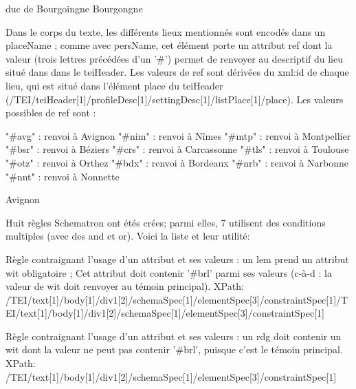 \documentclass[12pt, a4paper]{article}
\begin{document}
                        
                           duc de
                              Bourgoingne
                              Bourgongne
                           
                           
                        
                     Dans le corps du texte, les différents lieux mentionnés sont encodés dans un placeName ; comme avec persName, cet élément porte un attribut ref
                        dont la valeur (trois lettres précédées d'un '#') permet de renvoyer au descriptif du lieu situé dans dans le teiHeader. Les valeurs de ref sont dérivées du
                        xml:id de chaque lieu, qui est situé dans l'élément place du teiHeader (/TEI/teiHeader[1]/profileDesc[1]/settingDesc[1]/listPlace[1]/place).
                        Les valeurs possibles de ref sont :
                        
                           "#avg" : renvoi à Avignon
                           "#nim" : renvoi à Nîmes
                           "#mtp" : renvoi à Montpellier
                           "#bsr" : renvoi à Béziers
                           "#crs" : renvoi à Carcassonne
                           "#tls" : renvoi à Toulouse
                           "#otz" : renvoi à Orthez
                           "#bdx" : renvoi à Bordeaux
                           "#nrb" : renvoi à Narbonne
                           "#nnt" : renvoi à Nonnette
                        
                        
                           Avignon
                        
                     Huit règles Schematron ont étés crées; parmi elles, 7 utilisent des conditions multiples (avec des and et or). Voici la liste et leur utilité:
                     
                        Règle contraignant l'usage d'un attribut et ses valeurs : un lem prend un attribut wit obligatoire ;
                           Cet attribut doit contenir '#brl' parmi ses valeurs (c-à-d : la valeur de wit doit renvoyer au témoin principal).
                           XPath: /TEI/text[1]/body[1]/div1[2]/schemaSpec[1]/elementSpec[3]/constraintSpec[1]/TEI/text[1]/body[1]/div1[2]/schemaSpec[1]/elementSpec[3]/constraintSpec[1]
                        
                        Règle contraignant l'usage d'un attribut et ses valeurs : un rdg doit contenir un wit dont la valeur ne peut pas
                           contenir '#brl', puisque c'est le témoin principal.
                           XPath: /TEI/text[1]/body[1]/div1[2]/schemaSpec[1]/elementSpec[3]/constraintSpec[1]
                        
\end{document}
